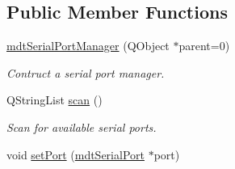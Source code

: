 \subsection*{Public Member Functions}
\begin{DoxyCompactItemize}
\item 
\hyperlink{classmdt_serial_port_manager_a6508372bcab37a73546fc2c24ee6415c}{mdtSerialPortManager} (QObject $\ast$parent=0)
\begin{DoxyCompactList}\small\item\em Contruct a serial port manager. \end{DoxyCompactList}\item 
QStringList \hyperlink{classmdt_serial_port_manager_a8b9c19a9b5a927e434a888b901a8ccff}{scan} ()
\begin{DoxyCompactList}\small\item\em Scan for available serial ports. \end{DoxyCompactList}\item 
\hypertarget{classmdt_serial_port_manager_aa33e4efc1a98d8e2edf8eee7a15b6cad}{
void \hyperlink{classmdt_serial_port_manager_aa33e4efc1a98d8e2edf8eee7a15b6cad}{setPort} (\hyperlink{classmdt_serial_port}{mdtSerialPort} $\ast$port)}
\label{classmdt_serial_port_manager_aa33e4efc1a98d8e2edf8eee7a15b6cad}


\end{DoxyCompactItemize}
